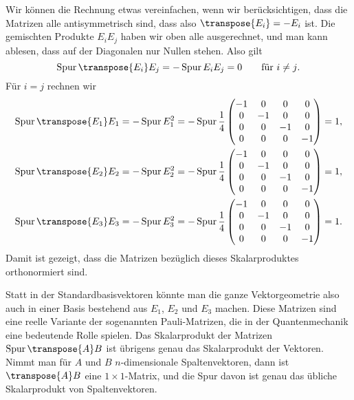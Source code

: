 \begin{loesung}
\begin{teilaufgaben}
Wir können die Rechnung etwas vereinfachen, wenn wir berücksichtigen,
dass die Matrizen alle antisymmetrisch sind, dass also $\transpose{E_i}=-E_i$ ist.
Die gemischten Produkte $E_iE_j$ haben wir oben alle ausgerechnet, und
man kann ablesen, dass auf der Diagonalen nur Nullen stehen. Also gilt
\[
\operatorname{Spur}\transpose{E_i}E_j
=
-\operatorname{Spur}E_iE_j=0
\qquad
\text{für $i\ne j$}.
\]
Für $i=j$ rechnen wir
\begin{align*}
\operatorname{Spur}\transpose{E_1}E_1
&=-\operatorname{Spur}E_1^2
=-\operatorname{Spur}\frac14\begin{pmatrix}
-1& 0& 0& 0\\
 0&-1& 0& 0\\
 0& 0&-1& 0\\
 0& 0& 0&-1
\end{pmatrix}
=1,
\\
\operatorname{Spur}\transpose{E_2}E_2
&=-\operatorname{Spur}E_2^2
=-\operatorname{Spur}\frac14\begin{pmatrix}
-1& 0& 0& 0\\
 0&-1& 0& 0\\
 0& 0&-1& 0\\
 0& 0& 0&-1
\end{pmatrix}
=1,
\\
\operatorname{Spur}\transpose{E_3}E_3
&=-\operatorname{Spur}E_3^2
=-\operatorname{Spur}\frac14\begin{pmatrix}
-1& 0& 0& 0\\
 0&-1& 0& 0\\
 0& 0&-1& 0\\
 0& 0& 0&-1
\end{pmatrix}
=1.
\end{align*}
Damit ist gezeigt, dass die Matrizen bezüglich dieses Skalarproduktes
orthonormiert sind.
\qedhere
\end{teilaufgaben}
\end{loesung}

\begin{diskussion}
Statt in der Standardbasisvektoren könnte man die ganze Vektorgeometrie
also auch in einer Basis bestehend aus $E_1$, $E_2$ und $E_3$ machen.
Diese Matrizen sind eine reelle Variante der sogenannten
Pauli-Matrizen,
die in der Quantenmechanik eine bedeutende Rolle spielen.
Das Skalarprodukt der Matrizen $\operatorname{Spur}\transpose{A}B$ ist übrigens
genau das Skalarprodukt der Vektoren. Nimmt man für $A$ und $B$
$n$-dimensionale Spaltenvektoren, dann ist $\transpose{A}B$ eine $1\times 1$-Matrix,
und die Spur davon ist genau das übliche Skalarprodukt von Spaltenvektoren.
\end{diskussion}

